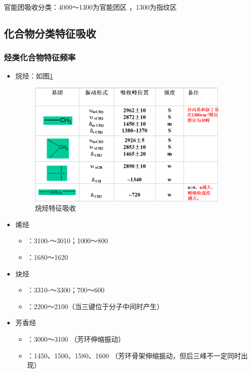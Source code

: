 \begin{note}                  
	官能团吸收分类：4000～1300为官能团区 ，1300为指纹区
\end{note}
\subsection{化合物分类特征吸收}
\subsubsection*{ 烃类化合物特征频率}
\begin{itemize}
    \item 烷烃：如图\ref{fig:chp5_ch}
    \begin{figure}[ht]
        \centering
        \includegraphics[width=10cm]{image/chp5_ch.png}
        \caption{烷烃特征吸收}
        \label{fig:chp5_ch}
    \end{figure}
    \item 烯烃
    \begin{itemize}                    
    	\item {}：3100-～3010；1000～800
        \item {}：1680～1620
    \end{itemize}
    \item 炔烃
    \begin{itemize}                  
    	\item {}：3310-～3300；700～600
        \item {}：2200～2100（当三键位于分子中间时产生）
    \end{itemize}
    \item 芳香烃
    \begin{itemize}         
        \item {}：3000～3100 （芳环伸缩振动）
        \item {}：1450、1500、1580、1600 （芳环骨架伸缩振动，但后三峰不一定同时出现）

\end{itemize}
\end{itemize}
